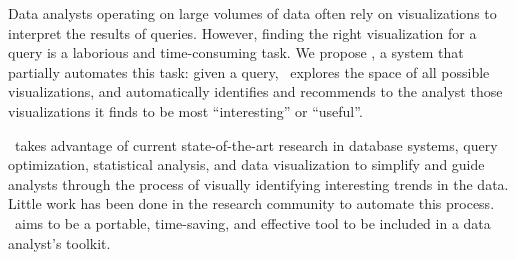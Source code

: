 Data analysts operating on large volumes of data 
often rely on visualizations to interpret the results of queries. 
However, finding the right visualization for a query is 
a laborious and time-consuming task. 
We propose \SeeDB, a system that partially automates 
this task: 
given a query, \SeeDB\ explores the space of all possible visualizations,
and automatically identifies and recommends to the analyst those visualizations
it finds to be most ``interesting'' or ``useful''.

\SeeDB\ takes advantage of current state-of-the-art research in database systems, query optimization, statistical analysis, and data visualization to simplify and guide analysts through the process of visually identifying interesting trends in the data. Little work has been done in the research community to automate this process. \SeeDB\ aims to be a portable, time-saving, and effective tool to be included in a data analyst's toolkit. 